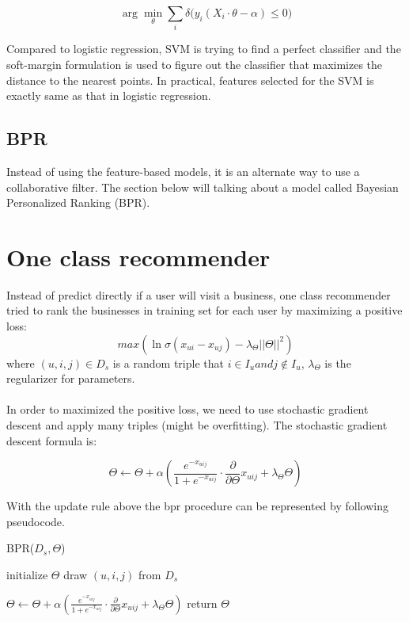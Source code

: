 \documentclass[paper=a4, fontsize=11pt, twocolumn]{scrartcl} %
\numberwithin{equation}{section} %
\numberwithin{figure}{section} %
\numberwithin{table}{section} %
\begin{document}
$$\arg {{\min }_{\theta }}\sum_{i}{\delta ({{y}_{i}}({{X}_{i}}\cdot \theta -\alpha )}\le 0)$$

Compared to logistic regression, SVM is trying to find a perfect classifier and the soft-margin formulation is used to figure out the classifier that maximizes the distance to the nearest points. In practical, features selected for the SVM is exactly same as that in logistic regression.

\subsection{BPR}

Instead of using the feature-based models, it is an alternate way to use a collaborative filter. The section below will talking about a model called Bayesian Personalized Ranking (BPR). 

\section{One class recommender}

Instead of predict directly if a user will visit a business, one class recommender tried to rank the businesses in training set for each user by maximizing a positive loss:
$$max(\ln\sigma(x_{ui} - x_{uj})-\lambda_\Theta ||\Theta||^2)$$
where $(u,i,j)\in D_s$ is a random triple that $i\in I_u and j\notin I_u$, $\lambda_\Theta$ is the regularizer for parameters.\\
\\
In order to maximized the positive loss, we need to use stochastic gradient descent and apply many triples (might be overfitting). The stochastic gradient descent formula is:

$$\Theta\leftarrow\Theta + \alpha \left( 
\frac{e^{-x_{uij}}}{1+e^{-x_{uij}}} \cdot
\frac{\partial}{\partial\Theta}x_{uij} + \lambda_\Theta\Theta
\right)$$

With the update rule above the bpr procedure can be represented by following pseudocode.

\begin{algorithm}
  \caption{BPR($D_s, \Theta$)}
  \label{alg1}
  \begin{algorithmic}
  \STATE initialize $\Theta$
  \STATE draw $(u,i,j)$ from $D_s$
  
  \STATE $\Theta\leftarrow\Theta + \alpha \left( 
\frac{e^{-x_{uij}}}{1+e^{-x_{uij}}} \cdot
\frac{\partial}{\partial\Theta}x_{uij} + \lambda_\Theta\Theta
\right)$
  \ENDWHILE
  \STATE return $\Theta$
  \end{algorithmic}
\end{algorithm}
\end{document}
